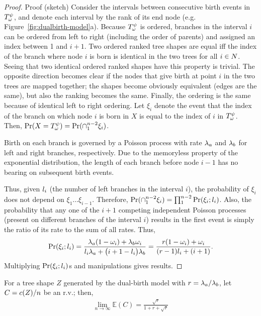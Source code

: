 \begin{proof}{Proof (sketch)}
Consider the intervals between consecutive birth events in $T^\psi_{\omega}$, and denote each interval by the rank of its end node (e.g. Figure~\ref{fig:dualbirth-model}a). Because $T^\psi_{\omega}$ is ordered, branches in the interval $i$ can be ordered from left to right (including the order of parents) and assigned an index between 1 and $i+1$. Two ordered ranked tree shapes are equal iff the index of the branch where node $i$ is born is identical in the two trees for all $i\in N$. Seeing that two identical ordered ranked shapes have this property is trivial. The opposite direction becomes clear if the nodes that give birth at point $i$ in the two trees are mapped together; the shapes become obviously equivalent (edges are the same), but also the ranking becomes the same. Finally, the ordering is the same because of identical left to right ordering. Let $\xi_i$ denote the event that the index of the branch on which node $i$ is born in $X$ is equal to the index of $i$ in $T^\psi_{\omega}$. Then, $\Pr(X=T^\psi_{\omega})=\Pr(\cap_1^{n-2} \xi_i)$.

Birth on each branch is governed by a Poisson process with rate $\lambda_a$ and $\lambda_b$ for left and right branches, respectively. Due to the memoryless property of the exponential distribution, the length of each branch before node $i-1$ has no bearing on subsequent birth events.

Thus, given $l_{i}$ (the number of left branches in the interval $i$), the probability of $\xi_i$ does not depend on $\xi_1\ldots \xi_{i-1}$. Therefore, $\Pr(\cap_1^{n-2} \xi_i)=\prod_1^{n-2} \Pr(\xi_i;l_{i})$. Also, the probability that any one of the $i+1$ competing independent Poisson processes (present on different branches of the interval $i$) results in the first event is simply the ratio of its rate to the sum of all rates. Thus,
$$\Pr(\xi_i;l_{i})=\frac{\lambda_a(1-\omega_i)+\lambda_b\omega_i}{l_{i}\lambda_a+\big(i+1-l_{i}\big)\lambda_b}
=\frac{r(1-\omega_i)+\omega_i}{(r-1)l_{i}+(i+1)}.$$
Multiplying $\Pr(\xi_i;l_{i})$s and manipulations gives results.
\end{proof}

\begin{theorem}\label{sup:thm:cherr}
For a tree shape $Z$ generated by the dual-birth model with $r=\lambda_a/\lambda_b$, let $C=c(Z)/n$ be an r.v.; then, 
\begin{align}\label{sup:eq:cherries} %
\lim_{n\to\infty}\mathbb{E}(C) = \frac{\sqrt{r}}{1+r+\sqrt{r}}
\end{align}
\end{theorem}

